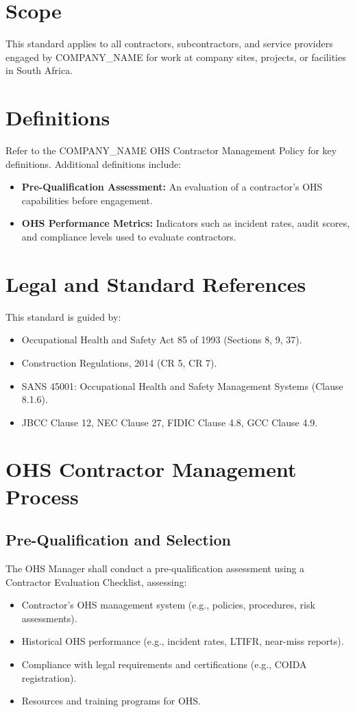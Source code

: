 \documentclass[12pt]{article}
\begin{document}
\section{Scope}
This standard applies to all contractors, subcontractors, and service providers engaged by {{COMPANY_NAME}} for work at company sites, projects, or facilities in South Africa.

\section{Definitions}
Refer to the {{COMPANY_NAME}} OHS Contractor Management Policy for key definitions. Additional definitions include:
\begin{itemize}
    \item \textbf{Pre-Qualification Assessment:} An evaluation of a contractor’s OHS capabilities before engagement.
    \item \textbf{OHS Performance Metrics:} Indicators such as incident rates, audit scores, and compliance levels used to evaluate contractors.
\end{itemize}

\section{Legal and Standard References}
This standard is guided by:
\begin{itemize}
    \item Occupational Health and Safety Act 85 of 1993 (Sections 8, 9, 37).
    \item Construction Regulations, 2014 (CR 5, CR 7).
    \item SANS 45001: Occupational Health and Safety Management Systems (Clause 8.1.6).
    \item JBCC Clause 12, NEC Clause 27, FIDIC Clause 4.8, GCC Clause 4.9.
\end{itemize}

\section{OHS Contractor Management Process}

\subsection{Pre-Qualification and Selection}
The OHS Manager shall conduct a pre-qualification assessment using a Contractor Evaluation Checklist, assessing:
\begin{itemize}
    \item Contractor’s OHS management system (e.g., policies, procedures, risk assessments).
    \item Historical OHS performance (e.g., incident rates, LTIFR, near-miss reports).
    \item Compliance with legal requirements and certifications (e.g., COIDA registration).
    \item Resources and training programs for OHS.
\end{itemize}
\end{document}
